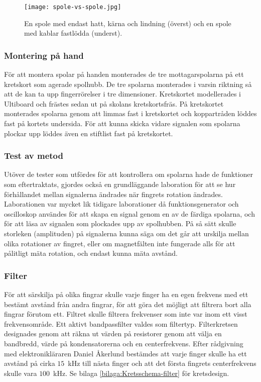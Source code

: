\documentclass[a4paper]{article}
\begin{document}
\begin{sloppypar}
    \begin{figure}[H]
        \centering
        \texttt{[image: spole-vs-spole.jpg]}
        \caption{En spole med endast hatt, kärna och lindning (överst) och en spole med kablar fastlödda (underst).}
        \label{fig:SpoleVsSpole}
    \end{figure}


    \subsubsection{Montering på hand} %
    För att montera spolar på handen monterades de tre mottagarspolarna på ett kretskort som agerade spolhubb.
    De tre spolarna monterades i varsin riktning så att de kan ta upp fingerrörelser i tre dimensioner.
    Kretskortet modellerades i Ultiboard och frästes sedan ut på skolans kretskortsfräs.
    På kretskortet monterades spolarna genom att limmas fast i kretskortet och koppartråden löddes fast på kortets undersida.
    För att kunna skicka vidare signalen som spolarna plockar upp löddes även en stiftlist fast på kretskortet.

    \subsubsection{Test av metod}
    Utöver de tester som utfördes för att kontrollera om spolarna hade de funktioner som eftertraktats, gjordes också en grundläggande laboration för att se hur förhållandet mellan signalerna ändrades när fingrets rotation ändrades.
    Laborationen var mycket lik tidigare laborationer då funktionsgenerator och oscilloskop användes för att skapa en signal genom en av de färdiga spolarna, och för att läsa av signalen som plockades upp av spolhubben.
    På så sätt skulle storleken (amplituden) på signalerna kunna säga om det går att urskilja mellan olika rotationer av fingret, eller om magnetfälten inte fungerade alls för att pålitligt mäta rotation, och endast kunna mäta avstånd.


    \subsubsection{Filter}
    För att särskilja på olika fingrar skulle varje finger ha en egen frekvens med ett bestämt avstånd från andra fingrar, för att göra det möjligt att filtrera bort alla fingrar förutom ett.
    Filtret skulle filtrera frekvenser som inte var inom ett visst frekvensområde.
    Ett aktivt bandpassfilter valdes som filtertyp.
    Filterkretsen designades genom att räkna ut värden på resistorer genom att välja en bandbredd, värde på kondensatorerna och en centerfrekvens.
    Efter rådgivning med elektronikläraren Daniel Åkerlund bestämdes att varje finger skulle ha ett avstånd på cirka $15$~kHz till nästa finger och att det första fingrets centerfrekvens skulle vara $100$~kHz.
    Se bilaga \ref{bilaga:Kretsschema-filter} för kretsdesign.


\end{sloppypar}
\end{document}
